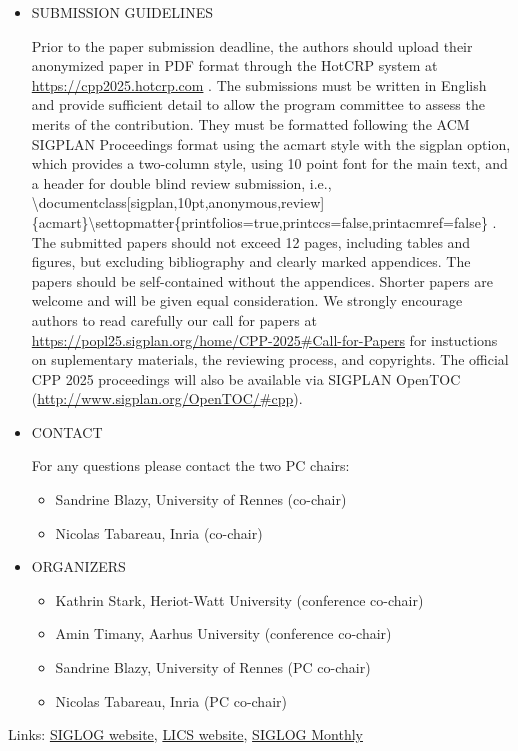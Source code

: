 \documentclass[prodmode,acmtecs]{acmsmall} %
\begin{document}
\begin{itemize}
\item  SUBMISSION GUIDELINES 
 
  Prior to the paper submission deadline, the authors should upload their anonymized paper in PDF format through the HotCRP system at \href{https://cpp2025.hotcrp.com}{https://cpp2025.hotcrp.com} . The submissions must be written in English and provide sufficient detail to allow the program committee to assess the merits of the contribution. They must be formatted following the ACM SIGPLAN Proceedings format using the acmart style with the sigplan option, which provides a two-column style, using 10 point font for the main text, and a header for double blind review submission, i.e., \textbackslash{}documentclass[sigplan,10pt,anonymous,review]\{acmart\}\textbackslash{}settopmatter\{printfolios=true,printccs=false,printacmref=false\} . The submitted papers should not exceed 12 pages, including tables and figures, but excluding bibliography and clearly marked appendices. The papers should be self-contained without the appendices. Shorter papers are welcome and will be given equal consideration. We strongly encourage authors to read carefully our call for papers at \href{https://popl25.sigplan.org/home/CPP-2025#Call-for-Papers}{https://popl25.sigplan.org/home/CPP-2025\#Call-for-Papers} for instuctions on suplementary materials, the reviewing process, and copyrights. The official CPP 2025 proceedings will also be available via SIGPLAN OpenTOC (\href{http://www.sigplan.org/OpenTOC/#cpp}{http://www.sigplan.org/OpenTOC/\#cpp}). 
 
\item  CONTACT 
 
  For any questions please contact the two PC chairs: 
 
\begin{itemize}\item  Sandrine Blazy, University of Rennes (co-chair)
\item  Nicolas Tabareau, Inria (co-chair)
\end{itemize} 
\item  ORGANIZERS 
 
\begin{itemize}\item  Kathrin Stark, Heriot-Watt University (conference co-chair)
\item  Amin Timany, Aarhus University (conference co-chair)
\item  Sandrine Blazy, University of Rennes (PC co-chair)
\item  Nicolas Tabareau, Inria (PC co-chair)
\end{itemize} 
\end{itemize}


\bigskip Links: \href{http://siglog.org/}{SIGLOG website}, \href{https://lics.siglog.org}{LICS website}, \href{https://lics.siglog.org/newsletters/}{SIGLOG Monthly}
\end{document}
